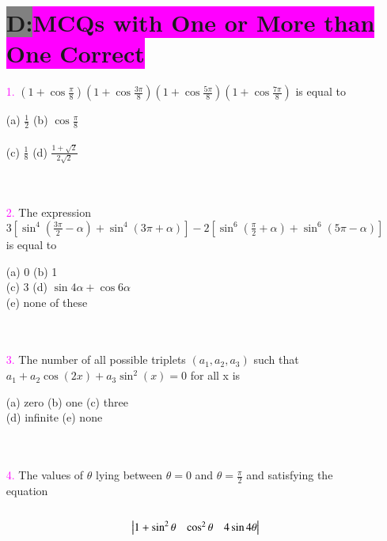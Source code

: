 \documentclass[journal,12pt,twocolumn,article]{IEEEtran}
\theoremstyle{remark}
\begin{document}
\begin{enumerate}
\section*{\color{black}\colorbox{gray}{\textbf{D:}}\color{white}\colorbox{magenta}{\textbf{MCQs with One or More than One Correct}}}
\item[\textcolor{magenta}{1.}] $(1 + \cos\frac{\pi}{8})(1 + \cos\frac{3\pi}{8})(1 + \cos\frac{5\pi}{8})(1 + \cos\frac{7\pi}{8})$ is equal to
\begin{flushright}
    \textcolor{magenta}{}
\end{flushright}
(a) $\frac{1}{2}$\quad
(b) $\cos \frac{\pi}{8}$\\\\
(c) $\frac{1}{8}$\quad
(d) $\frac{1+\sqrt{2}}{2\sqrt{2}}$\\\\\\
\item[\textcolor{magenta}{2.}] The expression $3[\sin^4(\frac{3\pi}{2} - \alpha) + \sin^4(3\pi + \alpha)] - 2[\sin^6(\frac{\pi}{2} + \alpha) + \sin^6(5\pi - \alpha)]$ is equal to
\begin{flushright}
    \textcolor{magenta}{}
\end{flushright}
(a) 0\quad
(b) 1\\
(c) 3\quad
(d) $\sin4\alpha + \cos6\alpha$\\
(e) none of these\\\\\\
\item[\textcolor{magenta}{3.}] The number of all possible triplets $(a_1, a_2, a_3)$ such that $a_1 + a_2 \cos(2x) + a_3\sin^2(x) = 0$ for all x is
\begin{flushright}
    \textcolor{magenta}{}
\end{flushright}
(a) zero\quad
(b) one\quad
(c) three\\
(d) infinite\quad
(e) none\\\\\\
\item[\textcolor{magenta}{4.}] The values of $\theta$ lying between $\theta = 0$ and $\theta = \frac{\pi}{2}$ and satisfying the\\equation\\\\
\[\begin{vmatrix}
    $$1+\sin^2\theta$$ & $$\cos^2\theta$$ & $$4\sin4\theta$$\\

\end{vmatrix}\]
\end{enumerate}
\end{document}
